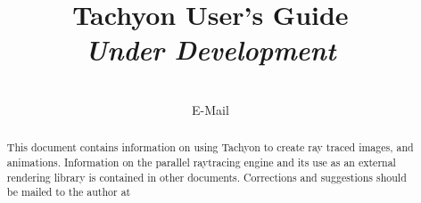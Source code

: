 \documentclass[11pt]{article}
\title{Tachyon User's Guide \\ {\em Under Development} }
\author{\AUTHORS\ \\ E-Mail \EMAIL}
\date{}
\begin{document}
\maketitle
\begin{abstract}

This document contains information on using Tachyon to create ray traced 
images, and animations.  Information on the parallel raytracing engine and its 
use as an external rendering library is contained in other documents.  
Corrections and suggestions should be mailed to the author at {\em \EMAIL} 
\end{abstract}
\newpage

\tableofcontents
\newpage






\newpage
\label{index:label}
\printindex
\end{document}
